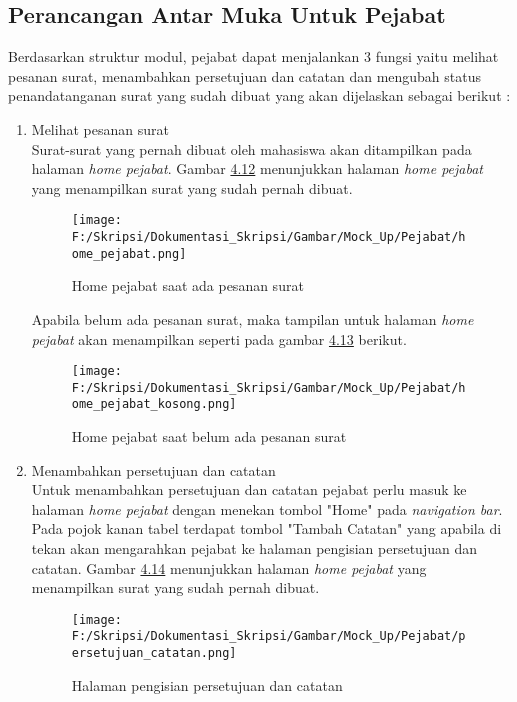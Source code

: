 \subsection{Perancangan Antar Muka Untuk Pejabat}
\label{sec:perancangan_antar_muka_pejabat}
Berdasarkan struktur modul, pejabat dapat menjalankan 3 fungsi yaitu melihat pesanan surat, menambahkan persetujuan dan catatan dan mengubah status penandatanganan surat yang sudah dibuat yang akan dijelaskan sebagai berikut :
\begin{enumerate}
	\item Melihat pesanan surat\\
	Surat-surat yang pernah dibuat oleh mahasiswa akan ditampilkan pada halaman \textit{home pejabat}. Gambar \hyperlink{home_pejabat_saat_ada_pesanan_surat}{4.12} menunjukkan halaman \textit{home pejabat} yang menampilkan surat yang sudah pernah dibuat.
	\begin{figure}[H]
	\centering
		\texttt{[image: F:/Skripsi/Dokumentasi\_Skripsi/Gambar/Mock\_Up/Pejabat/home\_pejabat.png]}
		\caption{Home pejabat saat ada pesanan surat}
		\label{fig:home_pejabat_saat_ada_pesanan_surat}
	\end{figure}
	
	Apabila belum ada pesanan surat, maka tampilan untuk halaman \textit{home pejabat} akan menampilkan seperti pada gambar \hyperlink{home_pejabat_saat_belum_ada_pesanan_surat}{4.13} berikut. 
	\begin{figure}[H]
	\centering
		\texttt{[image: F:/Skripsi/Dokumentasi\_Skripsi/Gambar/Mock\_Up/Pejabat/home\_pejabat\_kosong.png]}
		\caption{Home pejabat saat belum ada pesanan surat}
		\label{fig:home_pejabat_saat_belum_ada_pesanan_surat}
	\end{figure}
	
	\item Menambahkan persetujuan dan catatan\\
	Untuk menambahkan persetujuan dan catatan pejabat perlu masuk ke halaman \textit{home pejabat} dengan menekan tombol "Home" pada \textit{navigation bar}. Pada pojok kanan tabel terdapat tombol "Tambah Catatan" yang apabila di tekan akan mengarahkan pejabat ke halaman pengisian persetujuan dan catatan. Gambar \hyperlink{halaman_pengisian_persetujuan_dan_catatan}{4.14} menunjukkan halaman \textit{home pejabat} yang menampilkan surat yang sudah pernah dibuat.
	\begin{figure}[H]
	\centering
		\texttt{[image: F:/Skripsi/Dokumentasi\_Skripsi/Gambar/Mock\_Up/Pejabat/persetujuan\_catatan.png]}
		\caption{Halaman pengisian persetujuan dan catatan}
		\label{fig:halaman_pengisian_persetujuan_dan_catatan}
	\end{figure}
	

\end{enumerate}

